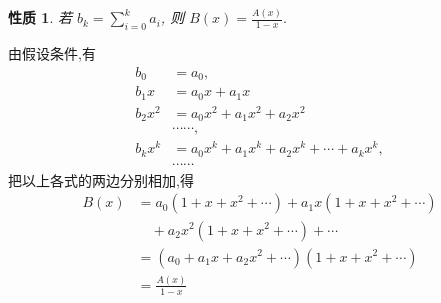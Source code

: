 \documentclass[punct]{ctexbeamer}
\newtheorem{pr}{性质}
\def\pf{\noindent {\bf 证明\ }}
\begin{document}
\begin{frame}
	\begin{pr}
		若 $b_{k}=\sum_{i=0}^{k} a_{i}$, 则
		$
		B(x)=\frac{A(x)}{1-x}.
		$
	\end{pr}
\pause
\pf 由假设条件,有
\begin{align*}
b_{0}& =a_{0}, \\
b_{1} x & =a_{0} x+a_{1} x \\
b_{2} x^{2} & =a_{0} x^{2}+a_{1} x^{2}+a_{2} x^{2} \\
& \cdots \cdots, \\
b_{k} x^{k}& =a_{0} x^{k}+a_{1} x^{k}+a_{2} x^{k}+\cdots+a_{k} x^{k}, \\
& \cdots \cdots
\end{align*}
把以上各式的两边分别相加,得
$$
\begin{aligned}
B(x)& = a_{0}\left(1+x+x^{2}+\cdots\right)+a_{1} x\left(1+x+x^{2}+\cdots\right) \\
&\quad +a_{2} x^{2}\left(1+x+x^{2}+\cdots\right)+\cdots \\
&=\left(a_{0}+a_{1} x+a_{2} x^{2}+\cdots\right)\left(1+x+x^{2}+\cdots\right) \\
&= \frac{A(x)}{1-x}
\end{aligned}
$$
\end{frame}

\end{document}
